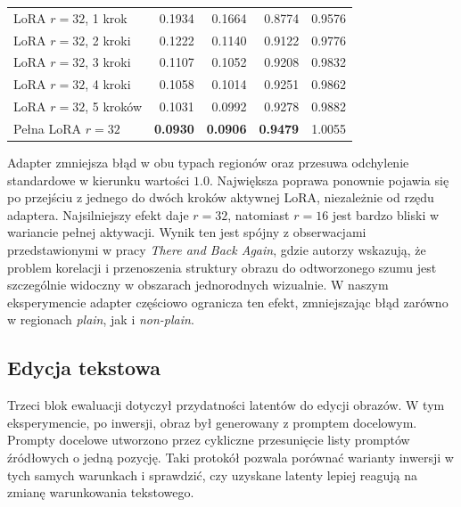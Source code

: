 \documentclass[
    left=2.5cm,
    right=2.5cm,
    top=2.5cm,
    bottom=3cm,
    bindingoffset=6mm,
    nohyphenation=false
]{szablon/eiti/sprawozdanie}
\begin{document}
\begin{table}[H]
{\begin{tabular}{lrrrr}
        \midrule
        LoRA $r=32$, 1 krok & 0.1934 & 0.1664 & 0.8774 & 0.9576 \\
        LoRA $r=32$, 2 kroki & 0.1222 & 0.1140 & 0.9122 & 0.9776 \\
        LoRA $r=32$, 3 kroki & 0.1107 & 0.1052 & 0.9208 & 0.9832 \\
        LoRA $r=32$, 4 kroki & 0.1058 & 0.1014 & 0.9251 & 0.9862 \\
        LoRA $r=32$, 5 kroków & 0.1031 & 0.0992 & 0.9278 & 0.9882 \\
        Pełna LoRA $r=32$ & \textbf{0.0930} & \textbf{0.0906} & \textbf{0.9479} & 1.0055 \\
        \bottomrule
    \end{tabular}}
\end{table}

Adapter zmniejsza błąd w obu typach regionów oraz przesuwa odchylenie
standardowe w kierunku wartości $1.0$. Największa poprawa ponownie pojawia
się po przejściu z jednego do dwóch kroków aktywnej LoRA, niezależnie od
rzędu adaptera. Najsilniejszy efekt daje $r=32$, natomiast $r=16$ jest
bardzo bliski w wariancie pełnej aktywacji. Wynik ten jest
spójny z obserwacjami przedstawionymi w pracy \emph{There and Back Again}\cite{staniszewski2026there},
gdzie autorzy wskazują, że problem korelacji i przenoszenia struktury obrazu
do odtworzonego szumu jest szczególnie widoczny w obszarach jednorodnych
wizualnie. W naszym eksperymencie adapter częściowo ogranicza ten efekt,
zmniejszając błąd zarówno w regionach \emph{plain}, jak i \emph{non-plain}.

\subsection{Edycja tekstowa}

Trzeci blok ewaluacji dotyczył przydatności latentów do edycji obrazów. W
tym eksperymencie, po inwersji, obraz był generowany z promptem docelowym.
Prompty docelowe utworzono przez cykliczne przesunięcie listy promptów
źródłowych o jedną pozycję. Taki protokół pozwala porównać warianty inwersji
w tych samych warunkach i sprawdzić, czy uzyskane latenty lepiej reagują na
zmianę warunkowania tekstowego.
\end{document}
